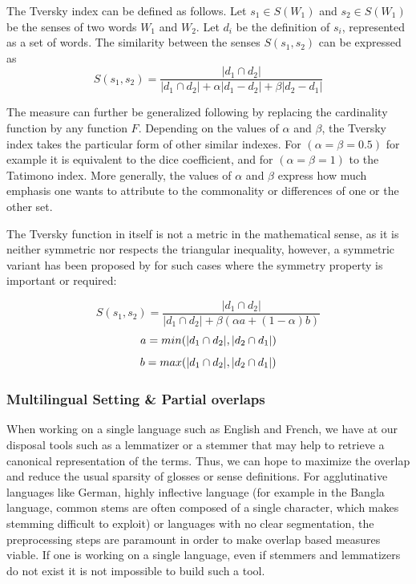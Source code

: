 \documentclass[10pt, a4paper]{article}
\begin{document}
The Tversky index can be defined as follows. Let \(s_1 \in S(W_1)\)  and \(s_2 \in S(W_1)\) be the senses of two words \(W_1\) and \(W_2\). Let \(d_i\) be the definition of \(s_i\), represented as a set of words. The similarity between the senses \(S(s_1, s_2)\) can be expressed as 
\[
S(s_1,s_2) = 
\frac{|d_1\cap d_2|}{|d_1\cap d_2| + \alpha |d_1-d_2| + \beta |d_2-d_1|}
\]

The measure can further be generalized following \cite{DBLP:conf/otm/PirroE10} by replacing the cardinality function by any function \(F\). Depending on the values of \(\alpha\) and \(\beta\), the Tversky index takes the particular form of other similar indexes. For \((\alpha=\beta=0.5)\) for example it is equivalent to the dice coefficient, and for  \((\alpha=\beta=1)\) to the Tatimono index. More generally, the values of \(\alpha\) and \(\beta\) express how much emphasis one wants to attribute to the commonality or differences of one or the other set.

 The Tversky function in itself is not a metric in the mathematical sense, as it is neither symmetric nor respects the triangular inequality, however, a symmetric variant has been proposed by \cite{Jimenez2010} for such cases where the symmetry property is important or required: 
 
 \[
 S(s_1,s_2) = \frac{|d_1\cap d_2|}{|d_1\cap d_2| + \beta (\alpha a + (1-\alpha)b)}\]
 \[
 a=min(|d_1\cap d_2|,|d_2\cap d_1|)\\
 \]\[
 b=max(|d_1\cap d_2|,|d_2\cap d_1|)\\ 
 \]

\subsubsection{Multilingual Setting \& Partial overlaps}
 When working on a single language such as English and French, we have at our disposal tools such as a lemmatizer or a stemmer that may help to retrieve a canonical representation of the terms. Thus, we can hope to maximize the overlap and reduce the usual sparsity of glosses or sense definitions. For agglutinative languages like German, highly inflective language (for example in the Bangla language, common stems are often composed of a single character, which makes stemming difficult to exploit) or languages with no clear segmentation, the preprocessing steps are paramount in order to make overlap based measures viable. If one is working on a single language, even if stemmers and lemmatizers do not exist it is not impossible to build such a tool.
\end{document}
